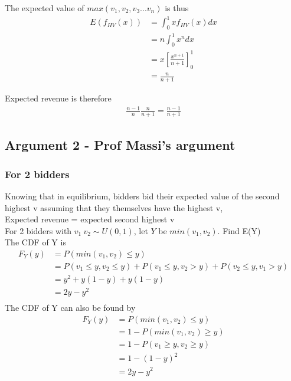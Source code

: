 \documentclass[10pt, a4paper]{article}
\begin{document}
The expected value of $max\left( v_1, v_2, v_3 ... v_n \right)$ is thus 
\begin{align*}
   E(f_{HV}(x))  &=  \int_0^1 x f_{HV}(x) dx \\
                 &=  n\int_0^1x^n dx \\
                 &=x \left[\frac{x^{n+1}}{n+1} \right] ^1_0 \\
                 &= \frac{n}{n+1}
\end{align*}

Expected revenue is therefore 
\begin{align*}
   \frac{n-1}{n} \frac{n}{n+1} = \frac{n-1}{n+1}
\end{align*}

\subsection{Argument 2 - Prof Massi's argument}

\subsubsection{For 2 bidders}
Knowing that in equilibrium, bidders bid their expected value of the second highest v assuming that they themselves have the highest v, \\

Expected revenue = expected second highest v\\

For 2 bidders with $v_1\ v_2 \sim U(0,1)$, let $Y$ be $min(v_1, v_2)$. Find E(Y)\\  

The CDF of Y is 
\begin{align*}
   F_Y(y) &= P(min(v_1, v_2) \le y) \\
          &= P(v_1 \le y, v_2 \le y) + P(v_1 \le y, v_2 > y) + P(v_2 \le y, v_1 > y) \\
          &= y^2 + y(1-y) + y(1-y) \\
          &= 2y - y^2 \\
\end{align*} 
The CDF of Y can also be found by 
\begin{align*}
   F_Y(y) &= P(min(v_1, v_2) \le y) \\ 
          &= 1 - P(min(v_1, v_2) \ge y) \\
          &= 1 - P(v_1 \ge y, v_2 \ge y) \\
          &= 1 - (1-y)^2 \\
          &= 2y - y^2 \\
\end{align*}
\end{document}

